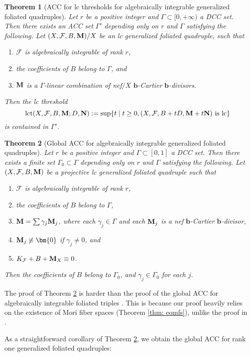 \documentclass[11pt]{amsart}
\numberwithin{equation}{section}
\newcommand{\bb}{\bm{b}}
\newcommand{\Mm}{{\bf{M}}}
\newcommand{\Nn}{{\bf{N}}}
\newcommand{\lct}{\operatorname{lct}}
\newcommand{\Ff}{\mathcal{F}}
\newcommand{\Ii}{\Gamma}
\newtheorem{thm}{Theorem}[subsection]
\theoremstyle{definition}
\theoremstyle{definition}
\theoremstyle{definition}
\begin{document}
\begin{thm}[ACC for lc thresholds for algebraically integrable generalized foliated quadruples]\label{thm: acc lct alg int gfq}
Let $r$ be a positive integer and $\Ii\subset [0,+\infty)$ a DCC set. Then there exists an ACC set $\Ii'$ depending only on $r$ and $\Ii$ satisfying the following. Let $(X,\Ff,B,\Mm)/X$ be an lc generalized foliated quadruple, such that 
\begin{enumerate}
    \item $\Ff$ is algebraically integrable of rank $r$, 
    \item the coefficients of $B$ belong to $\Ii$, and
    \item  $\Mm$ is a $\Ii$-linear combination of nef$/X$ $\bb$-Cartier $\bb$-divisors.
\end{enumerate}
Then the lc threshold
$$\lct(X,\Ff,B,\Mm;D,\Nn):=\sup\{t\mid t\geq 0, (X,\Ff,B+tD,\Mm+t\Nn)\text{ is lc}\}$$
is contained in $\Ii'$.
\end{thm}

\begin{thm}[Global ACC for algebraically integrable generalized foliated quadruples]\label{thm: global acc alg int gfq}
Let $r$ be a positive integer and $\Ii\subset [0,1]$ a DCC set. Then there exists a finite set $\Ii_0\subset\Ii$ depending only on $r$ and $\Ii$ satisfying the following. Let $(X,\Ff,B,\Mm)$ be a projective lc generalized foliated quadruple such that 
\begin{enumerate}
\item $\Ff$ is algebraically integrable of rank $r$, 
\item the coefficients of $B$ belong to $\Ii$,
\item  $\Mm=\sum\gamma_j\Mm_j$, where each $\gamma_j\in\Ii$ and each $\Mm_j$ is a nef $\bb$-Cartier $\bb$-divisor,
\item $\Mm_j\not\equiv\bm{0}$ if $\gamma_j\not=0$, and
\item $K_{\Ff}+B+\Mm_X\equiv 0$.
\end{enumerate}
Then the coefficients of $B$ belong to $\Ii_0$, and $\gamma_j\in\Ii_0$ for each $j$.
\end{thm}
The proof of Theorem \ref{thm: global acc alg int gfq} is harder than the proof of the global ACC for algebraically integrable foliated triples \cite[Theorem 1.2]{DLM23}. This is because our proof heavily relies on the existence of Mori fiber spaces (Theorem \ref{thm: eomfs}), unlike the proof in \cite[Theorem 1.2]{DLM23}.

As a straightforward corollary of Theorem \ref{thm: global acc alg int gfq}, we obtain the global ACC for rank one generalized foliated quadruples:
\end{document}
